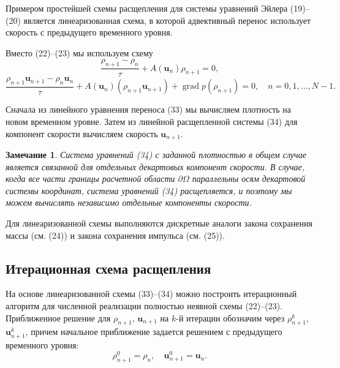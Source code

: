 \documentclass[10pt,twocolumn]{article}
\newtheorem{remark}{Замечание}
\begin{document}
Примером простейшей схемы расщепления для системы уравнений Эйлера (19)--(20) является линеаризованная схема, в которой адвективный перенос использует скорость с предыдущего временного уровня.

Вместо (22)--(23) мы используем схему
\begin{equation}
\frac{\rho_{n + 1} - \rho_n}{\tau} +A(\mathbf {u}_n)\rho_{n + 1} = 0, \tag{33}
\end{equation}
\begin{equation}
\frac{\rho_{n + 1}\mathbf{u}_{n + 1} - \rho_n\mathbf{u}_n}{\tau} +A(\mathbf {u}_n)(\rho_{n + 1}\mathbf{u}_{n + 1}) + \operatorname{grad}p(\rho_{n + 1}) = 0,\quad n = 0,1,\ldots ,N - 1. \tag{34}
\end{equation}

Сначала из линейного уравнения переноса (33) мы вычисляем плотность на новом временном уровне. Затем из линейной расщепленной системы (34) для компонент скорости вычисляем скорость \(\mathbf{u}_{n + 1}\).

\begin{remark}
Система уравнений (34) с заданной плотностью в общем случае является связанной для отдельных декартовых компонент скорости. В случае, когда все части границы расчетной области \(\partial \Omega\) параллельны осям декартовой системы координат, система уравнений (34) расщепляется, и поэтому мы можем вычислять независимо отдельные компоненты скорости.
\end{remark}

Для линеаризованной схемы выполняются дискретные аналоги закона сохранения массы (см. (24)) и закона сохранения импульса (см. (25)).

\subsection{Итерационная схема расщепления}

На основе линеаризованной схемы (33)--(34) можно построить итерационный алгоритм для численной реализации полностью неявной схемы (22)--(23). Приближенное решение для \(\rho_{n + 1}\), \(\mathbf{u}_{n + 1}\) на \(k\)-й итерации обозначим через \(\rho_{n + 1}^{k}\), \(\mathbf{u}_{n + 1}^{k}\), причем начальное приближение задается решением с предыдущего временного уровня:
\begin{equation}
\rho_{n + 1}^{0} = \rho_{n},\quad \mathbf{u}_{n + 1}^{0} = \mathbf{u}_{n}. \tag{35}
\end{equation}
\end{document}
